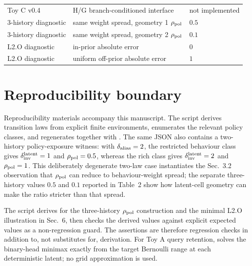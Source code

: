 \documentclass[10pt]{article}
\begin{document}
\begin{table}[H]
\begin{tabular}{@{}lll@{}}
Toy C v0.4 & H/G branch-conditioned interface & not implemented \\
3-history diagnostic & same weight spread, geometry 1 $\rho_{\rm pol}$ & $0.5$ \\
3-history diagnostic & same weight spread, geometry 2 $\rho_{\rm pol}$ & $0.1$ \\
L2.O diagnostic & in-prior absolute error & $0$ \\
L2.O diagnostic & uniform off-prior absolute error & $1$ \\
\bottomrule
\end{tabular}
\end{table}

\section{Reproducibility boundary}

Reproducibility materials accompany this manuscript. The script  derives transition laws from explicit finite environments, enumerates the relevant policy classes, and regenerates  together with . The same JSON also contains a two-history policy-exposure witness: with $\delta_{\rm alias}=2$, the restricted behaviour class gives $\delta_{\rm inv}^{\rm latent}=1$ and $\rho_{\rm pol}=0.5$, whereas the rich class gives $\delta_{\rm inv}^{\rm latent}=2$ and $\rho_{\rm pol}=1$. This deliberately degenerate two-law case instantiates the Sec.~3.2 observation that $\rho_{\rm pol}$ can reduce to behaviour-weight spread; the separate three-history values $0.5$ and $0.1$ reported in Table~2 show how latent-cell geometry can make the ratio stricter than that spread.

The script  derives  for the three-history $\rho_{\rm pol}$ construction and the minimal L2.O illustration in Sec.~6, then checks the derived values against explicit expected values as a non-regression guard. The assertions are therefore regression checks in addition to, not substitutes for, derivation. For Toy A query retention,  solves the binary-head minimax exactly from the target Bernoulli range at each deterministic latent; no grid approximation is used.
\end{document}
